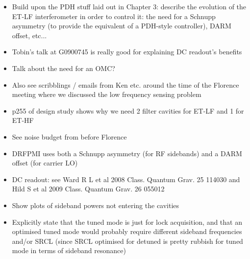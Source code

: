 \begin{itemize}
  \item Build upon the PDH stuff laid out in Chapter 3: describe the evolution of the ET-LF interferometer in order to control it: the need for a Schnupp asymmetry (to provide the equivalent of a PDH-style controller), DARM offset, etc...
  
  \item Tobin's talk at G0900745 is really good for explaining DC readout's benefits
  
  \item Talk about the need for an OMC?
  
  \item Also see scribblings / emails from Ken etc. around the time of the Florence meeting where we discussed the low frequency sensing problem
  
  \item p255 of design study shows why we need 2 filter cavities for ET-LF and 1 for ET-HF
  
  \item See noise budget from before Florence
  
  \item DRFPMI uses both a Schnupp asymmetry (for RF sidebands) and a DARM offset (for carrier LO)
  
  \item DC readout: see Ward R L et al 2008 Class. Quantum Grav. 25 114030 and Hild S et al 2009 Class. Quantum Grav. 26 055012
  
  \item Show plots of sideband powers not entering the cavities
  
  \item Explicitly state that the tuned mode is just for lock acquisition, and that an optimised tuned mode would probably require different sideband frequencies and/or SRCL (since SRCL optimised for detuned is pretty rubbish for tuned mode in terms of sideband resonance)


\end{itemize}
